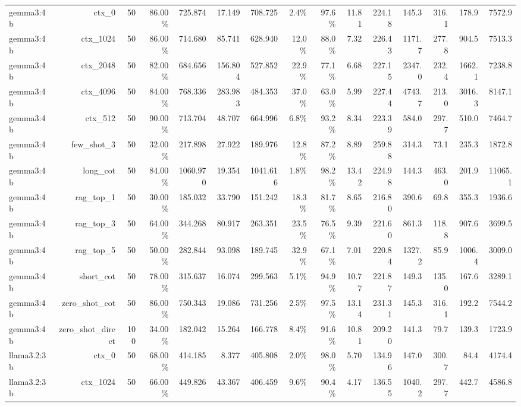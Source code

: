 \begin{table}[t]
\begin{tabular}{lrrrrrrrrrrrrrr}
gemma3:4b & ctx\_0 & 50 & 86.00\% & 725.874 & 17.149 & 708.725 & 2.4\% & 97.6\% & 11.81 & 224.18 & 145.3 & 316.1 & 178.9 & 7572.9 \\
gemma3:4b & ctx\_1024 & 50 & 86.00\% & 714.680 & 85.741 & 628.940 & 12.0\% & 88.0\% & 7.32 & 226.43 & 1171.7 & 277.8 & 904.5 & 7513.3 \\
gemma3:4b & ctx\_2048 & 50 & 82.00\% & 684.656 & 156.804 & 527.852 & 22.9\% & 77.1\% & 6.68 & 227.15 & 2347.0 & 232.4 & 1662.1 & 7238.8 \\
gemma3:4b & ctx\_4096 & 50 & 84.00\% & 768.336 & 283.983 & 484.353 & 37.0\% & 63.0\% & 5.99 & 227.44 & 4743.7 & 213.0 & 3016.3 & 8147.1 \\
gemma3:4b & ctx\_512 & 50 & 90.00\% & 713.704 & 48.707 & 664.996 & 6.8\% & 93.2\% & 8.34 & 223.39 & 584.0 & 297.7 & 510.0 & 7464.7 \\
gemma3:4b & few\_shot\_3 & 50 & 32.00\% & 217.898 & 27.922 & 189.976 & 12.8\% & 87.2\% & 8.89 & 259.88 & 314.3 & 73.1 & 235.3 & 1872.8 \\
gemma3:4b & long\_cot & 50 & 84.00\% & 1060.970 & 19.354 & 1041.616 & 1.8\% & 98.2\% & 13.42 & 224.98 & 144.3 & 463.0 & 201.9 & 11065.1 \\
gemma3:4b & rag\_top\_1 & 50 & 30.00\% & 185.032 & 33.790 & 151.242 & 18.3\% & 81.7\% & 8.65 & 216.80 & 390.6 & 69.8 & 355.3 & 1936.6 \\
gemma3:4b & rag\_top\_3 & 50 & 64.00\% & 344.268 & 80.917 & 263.351 & 23.5\% & 76.5\% & 9.39 & 221.60 & 861.3 & 118.8 & 907.6 & 3699.5 \\
gemma3:4b & rag\_top\_5 & 50 & 50.00\% & 282.844 & 93.098 & 189.745 & 32.9\% & 67.1\% & 7.01 & 220.84 & 1327.2 & 85.9 & 1006.4 & 3009.0 \\
gemma3:4b & short\_cot & 50 & 78.00\% & 315.637 & 16.074 & 299.563 & 5.1\% & 94.9\% & 10.77 & 221.87 & 149.3 & 135.0 & 167.6 & 3289.1 \\
gemma3:4b & zero\_shot\_cot & 50 & 86.00\% & 750.343 & 19.086 & 731.256 & 2.5\% & 97.5\% & 13.14 & 231.31 & 145.3 & 316.1 & 192.2 & 7544.2 \\
gemma3:4b & zero\_shot\_direct & 100 & 34.00\% & 182.042 & 15.264 & 166.778 & 8.4\% & 91.6\% & 10.81 & 209.20 & 141.3 & 79.7 & 139.3 & 1723.9 \\
llama3.2:3b & ctx\_0 & 50 & 68.00\% & 414.185 & 8.377 & 405.808 & 2.0\% & 98.0\% & 5.70 & 134.96 & 147.0 & 300.7 & 84.4 & 4174.4 \\
llama3.2:3b & ctx\_1024 & 50 & 66.00\% & 449.826 & 43.367 & 406.459 & 9.6\% & 90.4\% & 4.17 & 136.55 & 1040.2 & 297.7 & 442.7 & 4586.8 \\

\end{tabular}
\end{table}
